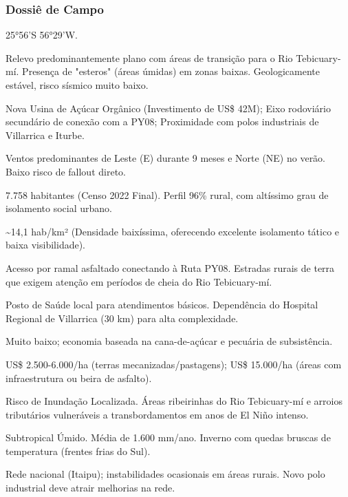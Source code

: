 \subsubsection{Dossiê de Campo}
\begin{description}[style=nextline,leftmargin=0.5cm,font=\bfseries]
\item[Coordenadas]  25°56'S 56°29'W.
\item[Topografia]  Relevo predominantemente plano com áreas de transição para o Rio Tebicuary-mí. Presença de "esteros" (áreas úmidas) em zonas baixas. Geologicamente estável, risco sísmico muito baixo.
\item[Alvos Estratégicos]  Nova Usina de Açúcar Orgânico (Investimento de US\$ 42M); Eixo rodoviário secundário de conexão com a PY08; Proximidade com polos industriais de Villarrica e Iturbe.
\item[Fallout]  Ventos predominantes de Leste (E) durante 9 meses e Norte (NE) no verão. Baixo risco de fallout direto.
\item[População]  7.758 habitantes (Censo 2022 Final). Perfil 96\% rural, com altíssimo grau de isolamento social urbano.
\item[Densidade]  \textasciitilde 14,1 hab/\allowbreak km² (Densidade baixíssima, oferecendo excelente isolamento tático e baixa visibilidade).
\item[Vias de Acesso]  Acesso por ramal asfaltado conectando à Ruta PY08. Estradas rurais de terra que exigem atenção em períodos de cheia do Rio Tebicuary-mí.
\item[Serviços]  Posto de Saúde local para atendimentos básicos. Dependência do Hospital Regional de Villarrica (30 km) para alta complexidade.
\item[Custo de Vida]  Muito baixo; economia baseada na cana-de-açúcar e pecuária de subsistência.
\item[Preço da Terra]  US\$ 2.500-6.000/\allowbreak ha (terras mecanizadas/\allowbreak pastagens); US\$ 15.000/\allowbreak ha (áreas com infraestrutura ou beira de asfalto).
\item[Hidrologia]  Risco de Inundação Localizada. Áreas ribeirinhas do Rio Tebicuary-mí e arroios tributários vulneráveis a transbordamentos em anos de El Niño intenso.
\item[Clima]  Subtropical Úmido. Média de 1.600 mm/\allowbreak ano. Inverno com quedas bruscas de temperatura (frentes frias do Sul).
\item[Energia]  Rede nacional (Itaipu); instabilidades ocasionais em áreas rurais. Novo polo industrial deve atrair melhorias na rede.

\end{description}
